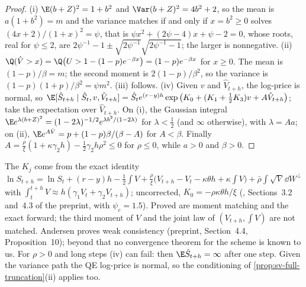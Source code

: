 \begin{proof}
(i) $\E(b+Z)^2=1+b^2$ and $\Var(b+Z)^2=4b^2+2$, so the mean is $a(1+b^2)=m$ and the variance matches if and
only if $x=b^2\ge0$ solves $(4x+2)/(1+x)^2=\psi$, that is $\psi x^2+(2\psi-4)x+\psi-2=0$, whose roots, real for
$\psi\le2$, are $2\psi^{-1}-1\pm\sqrt{2\psi^{-1}}\sqrt{2\psi^{-1}-1}$; the larger is nonnegative.
(ii) $\Q(\hat V>x)=\Q\big(U>1-(1-p)e^{-\beta x}\big)=(1-p)e^{-\beta x}$ for $x\ge0$. The mean is $(1-p)/\beta=m$; the
second moment is $2(1-p)/\beta^2$, so the variance is $(1-p)(1+p)/\beta^2=\psi m^2$.
(iii) follows. (iv) Given $v$ and $\hat V_{t+h}$, the log-price is normal, so
$\E[\hat S_{t+h}\mid\hat S_t,v,\hat V_{t+h}]=\hat S_te^{(r-y)h}\exp\big(K_0+(K_1+\frac12K_3)v+A\hat V_{t+h}\big)$; take
the expectation over $\hat V_{t+h}$. On (i), the Gaussian integral
$\E e^{\lambda(b+Z)^2}=(1-2\lambda)^{-1/2}e^{\lambda b^2/(1-2\lambda)}$ for $\lambda<\frac12$ (and $\infty$ otherwise), with
$\lambda=Aa$; on (ii), $\E e^{A\hat V}=p+(1-p)\beta/(\beta-A)$ for $A<\beta$. Finally
$A=\frac\rho\xi(1+\kappa\gamma_2h)-\frac12\gamma_2h\rho^2\le0$ for $\rho\le0$, while $a>0$ and $\beta>0$.
\end{proof}

The $K_j$ come from the exact identity
$\ln S_{t+h}=\ln S_t+(r-y)h-\frac12\int V+\frac\rho\xi\big(V_{t+h}-V_t-\kappa\theta h+\kappa\int V\big)+\bar\rho\int\sqrt V\,\dd W^\perp$
with $\int_t^{t+h}V\approx h(\gamma_1V_t+\gamma_2V_{t+h})$; uncorrected, $K_0=-\rho\kappa\theta h/\xi$ (\textcite{andersen-qe},
Sections~3.2 and~4.3 of the preprint, with $\psi_c=1.5$). Proved are moment matching and the exact forward; the third
moment of $V$ and the joint law of $(V_{t+h},\int V)$ are not matched. Andersen proves weak consistency (preprint,
Section~4.4, Proposition~10); beyond that no convergence theorem for the scheme is known to us.
For $\rho>0$ and long steps (iv) can fail: then $\E\hat S_{t+h}=\infty$ after one step. Given the variance path the
QE log-price is normal, so the conditioning of \cref{prop:sv-full-truncation}(ii) applies too.

